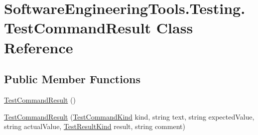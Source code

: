\hypertarget{class_software_engineering_tools_1_1_testing_1_1_test_command_result}{\section{Software\+Engineering\+Tools.\+Testing.\+Test\+Command\+Result Class Reference}
\label{class_software_engineering_tools_1_1_testing_1_1_test_command_result}
}
\subsection*{Public Member Functions}
\begin{DoxyCompactItemize}
\item 
\hyperlink{class_software_engineering_tools_1_1_testing_1_1_test_command_result_ab9477a5a7793419071f22eb65c225a4f}{Test\+Command\+Result} ()
\item 
\hyperlink{class_software_engineering_tools_1_1_testing_1_1_test_command_result_adf3582b7e8c937a2fb27ec29c6c7dc47}{Test\+Command\+Result} (\hyperlink{namespace_software_engineering_tools_1_1_testing_aa56e9d89003821b285e6eac88565f13a}{Test\+Command\+Kind} kind, string text, string expected\+Value, string actual\+Value, \hyperlink{namespace_software_engineering_tools_1_1_testing_a8aff450bdbdae45d2f8a72713e102ba2}{Test\+Result\+Kind} result, string comment)
\end{DoxyCompactItemize}
